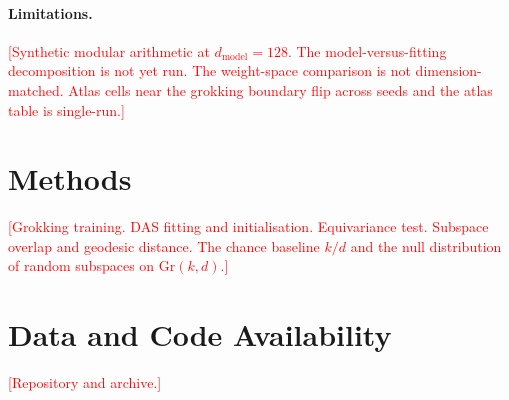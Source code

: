 \documentclass[11pt]{article}
\newcommand{\Gr}{\mathrm{Gr}}
\newcommand{\TODO}[1]{\textcolor{red}{[#1]}}
\begin{document}
\paragraph{Limitations.}
\TODO{Synthetic modular arithmetic at $d_\text{model} = 128$. The
model-versus-fitting decomposition is not yet run. The weight-space comparison is
not dimension-matched. Atlas cells near the grokking boundary flip across seeds
and the atlas table is single-run.}

\section{Methods}

\TODO{Grokking training. DAS fitting and initialisation. Equivariance test.
Subspace overlap and geodesic distance. The chance baseline $k/d$ and the null
distribution of random subspaces on $\Gr(k,d)$.}

\section*{Data and Code Availability}
\TODO{Repository and archive.}



\end{document}
